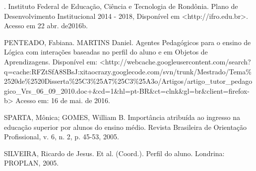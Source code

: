 \documentclass[article,12pt,onesidea,4paper,english,brazil]{abntex2}
\begin{document}
\noindent 	. Instituto Federal de Educação, Ciência e Tecnologia de Rondônia. Plano de Desenvolvimento Institucional 2014 - 2018, Disponível em <http://ifro.edu.br>. Acesso em 22 abr. de2016b.


\noindent PENTEADO, Fabiana. MARTINS Daniel. Agentes Pedagógicos para o ensino de Lógica com interações baseadas no perfil do aluno e em Objetos de Aprendizagens.
Disponível em:
<http://webcache.googleusercontent.com/search?q=cache:RFZtSfA8SBsJ:xitaocrazy.googlecode.com/svn/trunk/Mestrado/Tema\%2520de\%2520Disserta\%25C3\%25A7\%25C3\%25A3o/Artigos/artigo\_tutor\_pedagogico\_Vrs\_06\_09\_2010.doc+\&cd=1\&hl=pt-BR\&ct=clnk\&gl=br\&client=firefox-b> Acesso em: 16 de mai. de 2016.


\noindent SPARTA, Mônica; GOMES, William B. Importância atribuída ao ingresso na educação superior por alunos do ensino médio. Revista Brasileira de Orientação Profissional, v. 6, n. 2, p. 45-53, 2005.


\noindent  SILVEIRA, Ricardo de Jesus. Et al. (Coord.). Perfil do aluno. Londrina: PROPLAN, 2005.

	
\end{document}
